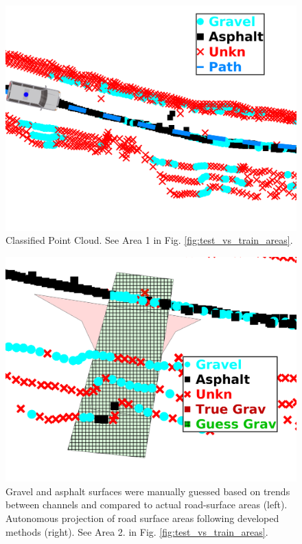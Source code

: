 \documentclass[journal,onecolumn]{IEEEtran}
\begin{document}
			\begin{figure}[H]
				\centering
				\includegraphics[width=0.75\linewidth]{figures/db1range_3.png}
				\caption[Classified Point Cloud]{Classified Point Cloud. See Area 1 in Fig. \ref{fig:test_vs_train_areas}.}
				\label{fig:raw_classification_results}
			\end{figure}
		
			\begin{figure}[H]
				\centering
				\includegraphics[width=0.75\linewidth]{figures/rm_db_6_overlap_2}
				\caption[Projected Guess vs Truth]{Gravel and asphalt surfaces were manually guessed based on trends between channels and compared to actual road-surface areas (left). Autonomous projection of road surface areas following developed methods (right). See Area 2. in Fig. \ref{fig:test_vs_train_areas}.}
				\label{fig:rm_db_6_overlap_2}
			\end{figure}
			
\end{document}
